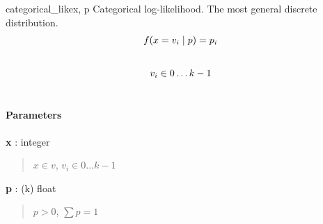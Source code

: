 \hypertarget{pymc.distributions.categorical_like}{}
\begin{funcdesc}{categorical\_like}{x, p}
Categorical log-likelihood. The most general discrete distribution.
\begin{gather}
\begin{split}f(x=v_i \mid p) = p_i\end{split}\notag\\\begin{split}\end{split}\notag
\end{gather}\begin{gather}
\begin{split}v_i \in 0 \ldots k-1\end{split}\notag\\\begin{split}\end{split}\notag
\end{gather}
\paragraph{Parameters}
\begin{paramlist}
\item[] \textbf{x} : integer
\begin{quote}
$x \in v$, $v_i \in 0 \ldots k-1$
\end{quote}

\item[]\textbf{p} : (k) float
\begin{quote}
$p > 0$, $\sum p = 1$
\end{quote}
\end{paramlist}
\end{funcdesc}

